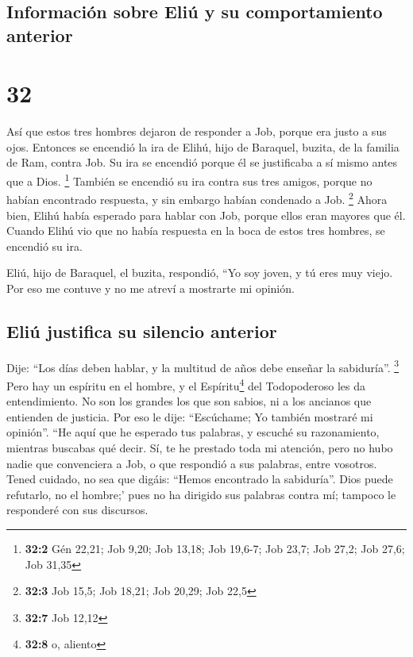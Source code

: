 \hypertarget{informaciuxf3n-sobre-eliuxfa-y-su-comportamiento-anterior}{%
\subsection{Información sobre Eliú y su comportamiento
anterior}\label{informaciuxf3n-sobre-eliuxfa-y-su-comportamiento-anterior}}

\hypertarget{section-31}{%
\section{32}\label{section-31}}

 Así que estos tres hombres dejaron de responder a Job,
porque era justo a sus ojos.  Entonces se encendió la ira
de Elihú, hijo de Baraquel, buzita, de la familia de Ram, contra Job. Su
ira se encendió porque él se justificaba a sí mismo antes que a Dios.
\footnote{\textbf{32:2} Gén 22,21; Job 9,20; Job 13,18; Job 19,6-7; Job
  23,7; Job 27,2; Job 27,6; Job 31,35}  También se
encendió su ira contra sus tres amigos, porque no habían encontrado
respuesta, y sin embargo habían condenado a Job. \footnote{\textbf{32:3}
  Job 15,5; Job 18,21; Job 20,29; Job 22,5}  Ahora bien,
Elihú había esperado para hablar con Job, porque ellos eran mayores que
él.  Cuando Elihú vio que no había respuesta en la boca de
estos tres hombres, se encendió su ira.

 Eliú, hijo de Baraquel, el buzita, respondió, ``Yo soy
joven, y tú eres muy viejo. Por eso me contuve y no me atreví a
mostrarte mi opinión.

\hypertarget{eliuxfa-justifica-su-silencio-anterior}{%
\subsection{Eliú justifica su silencio
anterior}\label{eliuxfa-justifica-su-silencio-anterior}}

 Dije: ``Los días deben hablar, y la multitud de años debe
enseñar la sabiduría''. \footnote{\textbf{32:7} Job 12,12}
 Pero hay un espíritu en el hombre, y el
Espíritu\footnote{\textbf{32:8} o, aliento} del Todopoderoso les da
entendimiento.  No son los grandes los que son sabios, ni
a los ancianos que entienden de justicia.  Por eso le
dije: ``Escúchame; Yo también mostraré mi opinión''. 
``He aquí que he esperado tus palabras, y escuché su razonamiento,
mientras buscabas qué decir.  Sí, te he prestado toda mi
atención, pero no hubo nadie que convenciera a Job, o que respondió a
sus palabras, entre vosotros.  Tened cuidado, no sea que
digáis: ``Hemos encontrado la sabiduría''. Dios puede refutarlo, no el
hombre;'  pues no ha dirigido sus palabras contra mí;
tampoco le responderé con sus discursos.

